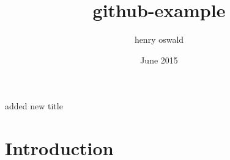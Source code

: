 \documentclass{article}
\title{github-example}
\author{henry oswald}
\date{June 2015}
\begin{document}
\maketitle
added new title
\section{Introduction}
\end{document}
